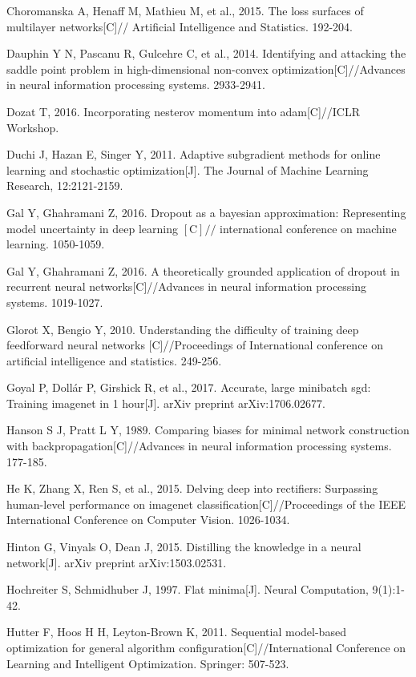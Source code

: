 \documentclass[10pt]{article}
\begin{document}
Choromanska A, Henaff M, Mathieu M, et al., 2015. The loss surfaces of multilayer networks[C]// Artificial Intelligence and Statistics. 192-204.

Dauphin Y N, Pascanu R, Gulcehre C, et al., 2014. Identifying and attacking the saddle point problem in high-dimensional non-convex optimization[C]//Advances in neural information processing systems. 2933-2941.

Dozat T, 2016. Incorporating nesterov momentum into adam[C]//ICLR Workshop.

Duchi J, Hazan E, Singer Y, 2011. Adaptive subgradient methods for online learning and stochastic optimization[J]. The Journal of Machine Learning Research, 12:2121-2159.

Gal Y, Ghahramani Z, 2016. Dropout as a bayesian approximation: Representing model uncertainty in deep learning $[\mathrm{C}] / /$ international conference on machine learning. 1050-1059.

Gal Y, Ghahramani Z, 2016. A theoretically grounded application of dropout in recurrent neural networks[C]//Advances in neural information processing systems. 1019-1027.

Glorot X, Bengio Y, 2010. Understanding the difficulty of training deep feedforward neural networks [C]//Proceedings of International conference on artificial intelligence and statistics. 249-256.

Goyal P, Dollár P, Girshick R, et al., 2017. Accurate, large minibatch sgd: Training imagenet in 1 hour[J]. arXiv preprint arXiv:1706.02677.

Hanson S J, Pratt L Y, 1989. Comparing biases for minimal network construction with backpropagation[C]//Advances in neural information processing systems. 177-185.

He K, Zhang X, Ren S, et al., 2015. Delving deep into rectifiers: Surpassing human-level performance on imagenet classification[C]//Proceedings of the IEEE International Conference on Computer Vision. 1026-1034.

Hinton G, Vinyals O, Dean J, 2015. Distilling the knowledge in a neural network[J]. arXiv preprint arXiv:1503.02531.

Hochreiter S, Schmidhuber J, 1997. Flat minima[J]. Neural Computation, 9(1):1-42.

Hutter F, Hoos H H, Leyton-Brown K, 2011. Sequential model-based optimization for general algorithm configuration[C]//International Conference on Learning and Intelligent Optimization. Springer: 507-523.
\end{document}
